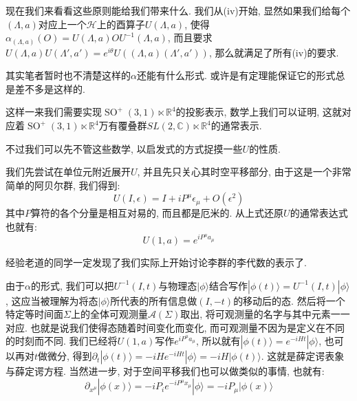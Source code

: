 现在我们来看看这些原则能给我们带来什么. 我们从(iv)开始, 显然如果我们给每个$(\Lambda, a)$对应上一个$\mathcal{H}$上的酉算子$U(\Lambda, a)$, 使得$\alpha_{(\Lambda, a)}(O)=U(\Lambda, a)OU^{-1}(\Lambda, a)$, 而且要求$U(\Lambda, a)U(\Lambda', a')=e^{i\theta}U((\Lambda, a)(\Lambda', a'))$, 那么就满足了所有(iv)的要求.
\begin{remark}
    其实笔者暂时也不清楚这样的$\alpha$还能有什么形式. 或许是有定理能保证它的形式总是差不多是这样的.
\end{remark}
这样一来我们需要实现$\operatorname{SO}^+(3, 1)\ltimes\mathbb{R}^4$的投影表示, 数学上我们可以证明, 这就对应着$\operatorname{SO}^+(3, 1)\ltimes\mathbb{R}^4$万有覆叠群$SL(2, \mathbb{C})\ltimes\mathbb{R}^4$的通常表示.\par
不过我们可以先不管这些数学, 以启发式的方式捉摸一些$U$的性质.\par
我们先尝试在单位元附近展开$U$, 并且先只关心其时空平移部分, 由于这是一个非常简单的阿贝尔群, 我们得到:
\begin{equation}
    U(I, \epsilon)=I+iP^\mu\epsilon_\mu+O(\epsilon^2)
\end{equation}
其中$P$算符的各个分量是相互对易的, 而且都是厄米的. 从上式还原$U$的通常表达式也就有:
\begin{equation}
    U(1,a)=e^{iP^\mu a_\mu}
\end{equation}
\begin{remark}
    经验老道的同学一定发现了我们实际上开始讨论李群的李代数的表示了.
\end{remark}
由于$\alpha$的形式, 我们可以把$U^{-1}(I, t)$与物理态$|\phi\rangle$结合写作$|\phi(t)\rangle=U^{-1}(I, t)|\phi\rangle$, 这应当被理解为将态$|\phi\rangle$所代表的所有信息做$(I, -t)$的移动后的态. 然后将一个特定等时间面$\Sigma$上的全体可观测量$\mathcal{A}(\Sigma)$取出, 将可观测量的名字与其中元素一一对应. 也就是说我们使得态随着时间变化而变化, 而可观测量不因为是定义在不同的时刻而不同. 我们已经将$U(1,a)$写作$e^{iP^\mu a_\mu}$, 所以就有$|\phi(t)\rangle=e^{-iHt}|\phi\rangle$, 也可以再对$t$做微分, 得到$\partial_t|\phi(t)\rangle=-iHe^{-iHt}|\phi\rangle=-iH|\phi(t)\rangle$. 这就是薛定谔表象与薛定谔方程. 当然进一步, 对于空间平移我们也可以做类似的事情, 也就有:
\begin{equation}
    \partial_{x^\mu}|\phi(x)\rangle=-iP_ie^{-iP^\mu x_\mu}|\phi\rangle=-iP_\mu|\phi(x)\rangle
\end{equation}\par
